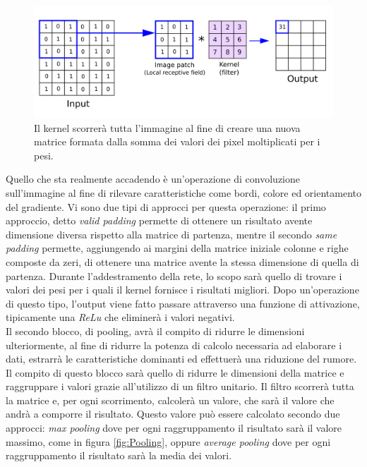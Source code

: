 \begin{figure}[H]
  \begin{center}
    \includegraphics[width=0.8\columnwidth]{images/kernel.png}
  \end{center}
  \caption{Il kernel scorrerà tutta l'immagine al fine di creare una nuova matrice formata dalla somma dei valori dei pixel moltiplicati per i pesi.}
  \label{fig:Kernel}
\end{figure}
Quello che sta realmente accadendo è un'operazione di convoluzione sull'immagine al fine di rilevare caratteristiche come bordi, colore ed orientamento del gradiente.
Vi sono due tipi di approcci per questa operazione: il primo approccio, detto \emph{valid padding} permette di ottenere un risultato avente dimensione diversa rispetto alla matrice di partenza, mentre il secondo \emph{same padding} permette, aggiungendo ai margini della matrice iniziale colonne e righe composte da zeri, di ottenere una matrice avente la stessa dimensione di quella di partenza. Durante l'addestramento della rete, lo scopo sarà quello di trovare i valori dei pesi per i quali il kernel fornisce i risultati migliori. Dopo un'operazione di questo tipo, l'output viene fatto passare attraverso una funzione di attivazione, tipicamente una \emph{ReLu} che eliminerà i valori negativi.
\\Il secondo blocco, di pooling, avrà il compito di ridurre le dimensioni ulteriormente, al fine di ridurre la potenza di calcolo necessaria ad elaborare i dati, estrarrà le caratteristiche dominanti ed effettuerà una riduzione del rumore. Il compito di questo blocco sarà quello di ridurre le dimensioni della matrice e raggruppare i valori grazie all'utilizzo di un filtro unitario. Il filtro scorrerà tutta la matrice e, per ogni scorrimento, calcolerà un valore, che sarà il valore che andrà a comporre il risultato. Questo valore può essere calcolato secondo due approcci: \emph{max pooling} dove per ogni raggruppamento il risultato sarà il valore massimo, come in figura \ref{fig:Pooling}, oppure \emph{average pooling} dove per ogni raggruppamento il risultato sarà la media dei valori.
